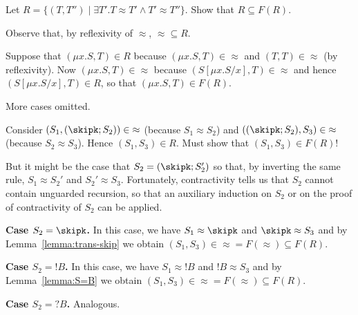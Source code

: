 Let $R = \{ (T, T'') \mid \exists T'. T \approx T' \wedge T' \approx T''\}$. 
Show that $R \subseteq F (R)$.

Observe that, by reflexivity of $\approx$, ${\approx} \subseteq R$.

Suppose that $(\mu x. S, T) \in R$ because $(\mu x.S, T) \in
{\approx}$ and $(T, T) \in {\approx}$ (by reflexivity). Now  $(\mu x.S, T) \in
{\approx}$ because $(S[\mu x.S/x], T) \in {\approx}$ and hence $(S[\mu
x.S/x], T) \in R$, so that $(\mu x. S, T) \in F(R)$. 

More cases omitted.

Consider $(S_1, (\skipk; S_2)) \in {\approx}$ (because  $S_1\approx S_2$)
and $((\skipk; S_2), S_3) \in {\approx}$ (because $S_2 \approx S_3$).
Hence $(S_1, S_3) \in R$. Must show that $(S_1, S_3) \in F (R)$!

But it might be the case that $S_2 = (\skipk; S_2')$ so that, by inverting the same rule, $S_1
\approx S_2'$  and $S_2' \approx S_3$. Fortunately, contractivity tells us that $S_2$ cannot contain 
unguarded recursion, so that an auxiliary induction on $S_2$ or on the proof of contractivity of $S_2$ can be
applied. 

\textbf{Case $S_2 = \skipk$.} In this case, we have $S_1 \approx
\skipk$ and $\skipk \approx S_3$ and by Lemma~\ref{lemma:trans-skip} we
obtain $(S_1, S_3) \in {\approx} = F ({\approx}) \subseteq F (R)$. 








\textbf{Case $S_2 = !B$.} 
In this case, we have $S_1 \approx {!B}$ and ${!B} \approx S_3$ and by
Lemma~\ref{lemma:S=B} we obtain  $(S_1, S_3) \in {\approx} = F
({\approx}) \subseteq F (R)$.

\textbf{Case $S_2 = ?B$.} Analogous.

\newpage
